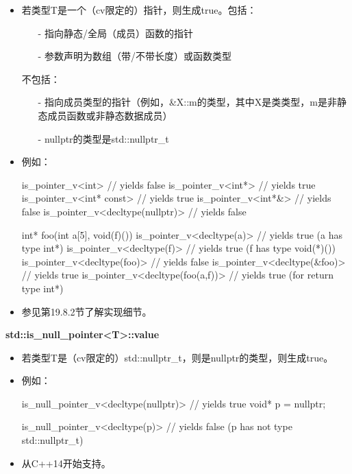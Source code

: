 \begin{itemize}
\item 
若类型T是一个（cv限定的）指针，则生成true。包括：
\begin{itemize}

\item[-] 
指向静态/全局（成员）函数的指针

\item[-] 
参数声明为数组（带/不带长度）或函数类型
\end{itemize}

不包括：

\begin{itemize}
\item[-] 
指向成员类型的指针（例如，\&X::m的类型，其中X是类类型，m是非静态成员函数或非静态数据成员）

\item[-] 
nullptr的类型是std::nullptr\_t
\end{itemize}

\item 
例如：

\begin{cpp}
is_pointer_v<int> // yields false
is_pointer_v<int*> // yields true
is_pointer_v<int* const> // yields true
is_pointer_v<int*&> // yields false
is_pointer_v<decltype(nullptr)> // yields false

int* foo(int a[5], void(f)()) {
	is_pointer_v<decltype(a)> // yields true (a has type int*)
	is_pointer_v<decltype(f)> // yields true (f has type void(*)())
	is_pointer_v<decltype(foo)> // yields false
	is_pointer_v<decltype(&foo)> // yields true
	is_pointer_v<decltype(foo(a,f))> // yields true (for return type int*)
}
\end{cpp}

\item 
参见第19.8.2节了解实现细节。
\end{itemize}

\textbf{std::is\_null\_pointer<T>::value}

\begin{itemize}
\item 
若类型T是（cv限定的）std::nullptr\_t，则是nullptr的类型，则生成true。

\item 
例如：
\begin{cpp}
is_null_pointer_v<decltype(nullptr)> // yields true
void* p = nullptr;

is_null_pointer_v<decltype(p)> // yields false (p has not type std::nullptr_t)
\end{cpp}

\item 
从C++14开始支持。
\end{itemize}


